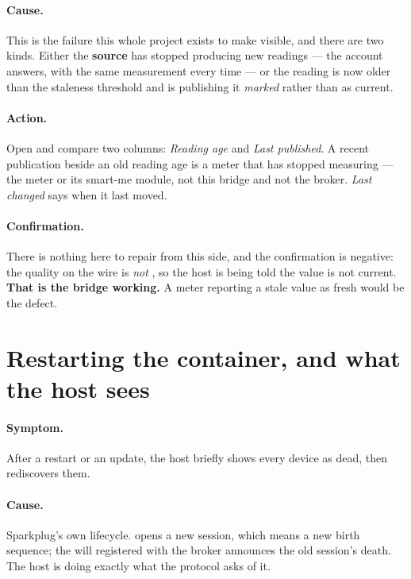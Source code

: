 \paragraph{Cause.} This is the failure this whole project exists to make visible, and there are
two kinds. Either the \textbf{source} has stopped producing new readings --- the account
answers, with the same measurement every time --- or the reading is now older than the
staleness threshold and \prog is publishing it \emph{marked} rather than as current.

\paragraph{Action.} Open  and compare two columns: \emph{Reading age} and
\emph{Last published}. A recent publication beside an old reading age is a meter that has
stopped measuring --- the meter or its smart-me module, not this bridge and not the broker.
\emph{Last changed} says when it last moved.

\paragraph{Confirmation.} There is nothing here to repair from this side, and the confirmation
is negative: the quality on the wire is \emph{not} , so the host is being told the
value is not current. \textbf{That is the bridge working.} A meter reporting a stale value as
fresh would be the defect.

\section{Restarting the container, and what the host sees}
\label{sec:trouble-restart}

\paragraph{Symptom.} After a restart or an update, the host briefly shows every device as
dead, then rediscovers them.

\paragraph{Cause.} Sparkplug's own lifecycle. \prog opens a new session, which means a new
birth sequence; the will registered with the broker announces the old session's death. The
host is doing exactly what the protocol asks of it.

